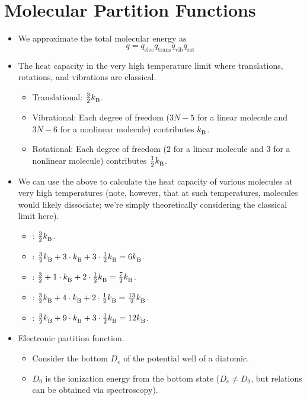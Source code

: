 \documentclass[../notes.tex]{subfiles}
\begin{document}
\section{Molecular Partition Functions}
\begin{itemize}
    \item {}We approximate the total molecular energy as
    \begin{equation*}
        q = q_\text{elec}q_\text{trans}q_\text{vib}q_\text{rot}
    \end{equation*}
    \item The heat capacity in the very high temperature limit where translations, rotations, and vibrations are classical.
    \begin{itemize}
        \item Translational: $\frac{3}{2}{k_\text{B}^{}}$.
        \item Vibrational: Each degree of freedom ($3N-5$ for a linear molecule and $3N-6$ for a nonlinear molecule) contributes ${k_\text{B}^{}}$.
        \item Rotational: Each degree of freedom ($2$ for a linear molecule and $3$ for a nonlinear molecule) contributes $\frac{1}{2}{k_\text{B}^{}}$.
    \end{itemize}
    \item We can use the above to calculate the heat capacity of various molecules at very high temperatures (note, however, that at such temperatures, molecules would likely dissociate; we're simply theoretically considering the classical limit here).
    \begin{itemize}
        \item {}: $\frac{3}{2}{k_\text{B}^{}}$.
        \item {}: $\frac{3}{2}{k_\text{B}^{}}+3\cdot{k_\text{B}^{}}+3\cdot\frac{1}{2}{k_\text{B}^{}}=6{k_\text{B}^{}}$.
        \item {}: $\frac{3}{2}+1\cdot{k_\text{B}^{}}+2\cdot\frac{1}{2}{k_\text{B}^{}}=\frac{7}{2}{k_\text{B}^{}}$.
        \item {}: $\frac{3}{2}{k_\text{B}^{}}+4\cdot{k_\text{B}^{}}+2\cdot\frac{1}{2}{k_\text{B}^{}}=\frac{13}{2}{k_\text{B}^{}}$.
        \item {}: $\frac{3}{2}{k_\text{B}^{}}+9\cdot{k_\text{B}^{}}+3\cdot\frac{1}{2}{k_\text{B}^{}}=12{k_\text{B}^{}}$.
    \end{itemize}
    \item Electronic partition function.
    \begin{itemize}
        \item Consider the bottom $D_e$ of the potential well of a diatomic.
        \item $D_0$ is the ionization energy from the bottom state ($D_e\neq D_0$, but relations can be obtained via spectroscopy).

\end{itemize}
\end{itemize}
\end{document}
